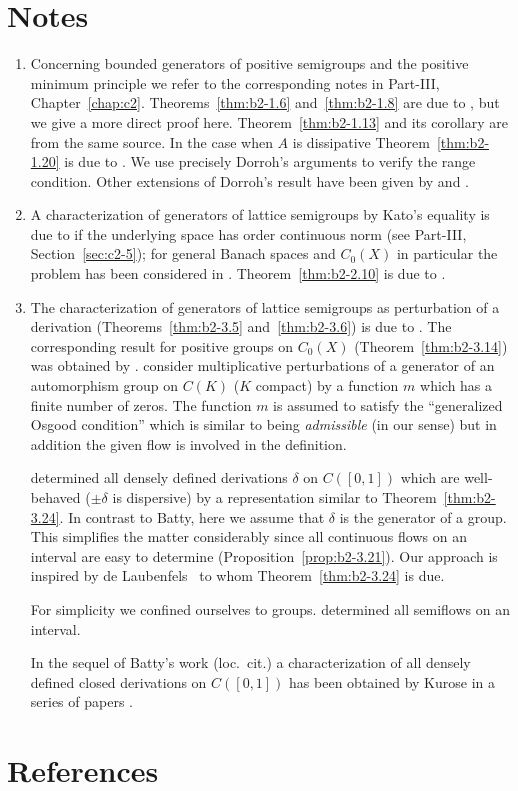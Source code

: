 \section*{Notes}
\label{notes:b2}
\begin{enumerate}[label=\emph{Section 2.\arabic*:}, wide]

\item
Concerning bounded generators of positive semigroups and the positive minimum principle we refer to the corresponding notes in Part-III, Chapter~\ref{chap:c2}. Theorems~\ref{thm:b2-1.6} and~\ref{thm:b2-1.8} are due to \textcite{arendtchernoffkato:1982}, but we give a more direct proof here.
Theorem~\ref{thm:b2-1.13} and its corollary are from the same source.
In the case when $A$ is dissipative Theorem~\ref{thm:b2-1.20} is due to \textcite{dorroh:1966}.
We use precisely Dorroh's arguments to verify the range condition.
Other extensions of Dorroh's result have been given by \textcite{lumer:1974} and \textcite{lumer:1975}.

\item 
A characterization of generators of lattice semigroups by Kato's equality is due to  \textcite{nageluhlig:1981} if the underlying space has order continuous norm (see Part-III, Section~\ref{sec:c2-5}); for general Banach spaces and $C_{0}(X)$ in particular the problem has been considered in \textcite{arendt:1982}.
Theorem~\ref{thm:b2-2.10} is due to \textcite{uhlig:1979}.

\item
The characterization of generators of lattice semigroups as perturbation of a derivation (Theorems~\ref{thm:b2-3.5} and~\ref{thm:b2-3.6}) is due to \textcite{derndingernagel:1979}.
The corresponding result for positive groups on $C_{0}(X)$ (Theorem~\ref{thm:b2-3.14}) was obtained by \textcite{arendtgreiner:1984}.
\textcite{linetal:1977} consider multiplicative perturbations of a generator of an automorphism group on $C(K)$ ($K$ compact) by a function $m$ which has a finite number of zeros.
The function $m$ is assumed to satisfy the \enquote{generalized Osgood condition} which is similar to being \emph{admissible} (in our sense) but in addition the given flow is involved in the definition.

\textcite{batty:1981} determined all densely defined derivations $\delta$ on $C([0,1])$ which are well-behaved (\ie  $\pm\delta$ is dispersive) by a representation similar to Theorem~\ref{thm:b2-3.24}.
In contrast to Batty, here we assume that $\delta$ is the generator of a group.
This simplifies the matter considerably since all continuous flows on an interval are easy to determine (Proposition~\ref{prop:b2-3.21}).
Our approach is inspired by de Laubenfels~\cite{delaubenfels:1984} to whom Theorem~\ref{thm:b2-3.24} is due.

For simplicity we confined ourselves to groups.
\textcite{uhlig:1979} determined all semiflows on an interval.

In the sequel of Batty's work (loc.\ cit.) a characterization of all densely defined closed derivations on $C([0,1])$ has been obtained by Kurose in a series of papers 
\cite{kurose:1981, kurose:1982, kurose:1983}.
\end{enumerate}
\section*{References}
{\RaggedRight
  \printbibliography[heading=none]
 }

